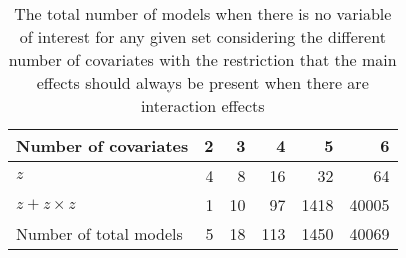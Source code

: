 \begin{table}[!h]
\centering
\caption{The total number of models when there is no variable of interest for any given set considering the different number of covariates with the restriction that the main effects should always be present when there are interaction effects} 
\begin{tabular}{lrrrrr}
  \hline
Number of covariates & 2 & 3 & 4 & 5 & 6 \\ 
  \hline
  $ z$ & 4 & 8 & 16 & 32 & 64 \\ 
  $ z + z \times z$ & 1 & 10 & 97 & 1418 & 40005 \\ 
  \hline
  Number of total models & 5 & 18 & 113 & 1450 & 40069 \\ 
   \hline
\end{tabular}
\end{table}
